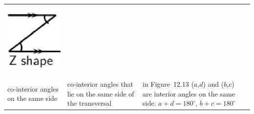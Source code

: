 \begin{center}
\begin{xtabular*}{\mytablewidth}[t]{|p{3cm}|p{3cm}|p{3cm}|p{20\mystarwidth}|}
    \setcounter{subfigure}{0}
\label{m39370*id316794}
    \begin{center}
    \label{m39370*id316794!!!underscore!!!media}\label{m39370*id316794!!!underscore!!!printimage}\includegraphics[width=.2\columnwidth]{col11306.imgs/m39370_MG10C13_012.png} %
      \vspace{2pt}
    \vspace{.1in}
    \end{center}    
     \tabularnewline{}
        co-interior angles on the same side &
        co-interior angles that lie on the same side of the transversal &
        in Figure~12.13 (\begin{math}a\end{math},\begin{math}d\end{math}) and (\begin{math}b\end{math},\begin{math}c\end{math}) are interior angles on the same side. \begin{math}a+d={180}^{\circ }\end{math}, \begin{math}b+c={180}^{\circ }\end{math} &

\end{xtabular*}
\end{center}
